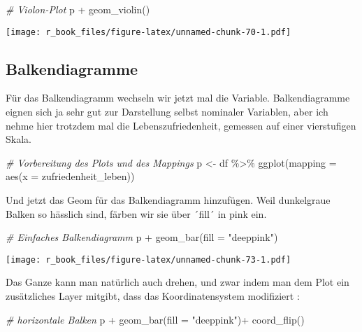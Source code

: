 \documentclass[
]{book}
\newenvironment{Shaded}{\begin{snugshade}}{\end{snugshade}}
\newcommand{\AttributeTok}[1]{\textcolor[rgb]{0.77,0.63,0.00}{#1}}
\newcommand{\CommentTok}[1]{\textcolor[rgb]{0.56,0.35,0.01}{\textit{#1}}}
\newcommand{\FunctionTok}[1]{\textcolor[rgb]{0.00,0.00,0.00}{#1}}
\newcommand{\NormalTok}[1]{#1}
\newcommand{\OtherTok}[1]{\textcolor[rgb]{0.56,0.35,0.01}{#1}}
\newcommand{\SpecialCharTok}[1]{\textcolor[rgb]{0.00,0.00,0.00}{#1}}
\newcommand{\StringTok}[1]{\textcolor[rgb]{0.31,0.60,0.02}{#1}}
\begin{document}
\begin{Shaded}
\begin{Highlighting}[]
\CommentTok{\# Violon{-}Plot}
\NormalTok{p }\SpecialCharTok{+} \FunctionTok{geom\_violin}\NormalTok{()}
\end{Highlighting}
\end{Shaded}

\texttt{[image: r\_book\_files/figure-latex/unnamed-chunk-70-1.pdf]}

\hypertarget{balkendiagramme}{%
\subsection{Balkendiagramme}\label{balkendiagramme}}

Für das Balkendiagramm wechseln wir jetzt mal die Variable. Balkendiagramme eignen sich ja sehr gut zur Darstellung selbst nominaler Variablen, aber ich nehme hier trotzdem mal die Lebenszufriedenheit, gemessen auf einer vierstufigen Skala.

\begin{Shaded}
\begin{Highlighting}[]
\CommentTok{\# Vorbereitung des Plots und des Mappings}
\NormalTok{p }\OtherTok{\textless{}{-}}\NormalTok{ df }\SpecialCharTok{\%\textgreater{}\%} 
  \FunctionTok{ggplot}\NormalTok{(}\AttributeTok{mapping =} \FunctionTok{aes}\NormalTok{(}\AttributeTok{x =}\NormalTok{ zufriedenheit\_leben))}
\end{Highlighting}
\end{Shaded}

Und jetzt das Geom für das Balkendiagramm hinzufügen. Weil dunkelgraue Balken so hässlich sind, färben wir sie über ´fill´ in pink ein.

\begin{Shaded}
\begin{Highlighting}[]
\CommentTok{\# Einfaches Balkendiagramm}
\NormalTok{p }\SpecialCharTok{+} \FunctionTok{geom\_bar}\NormalTok{(}\AttributeTok{fill =} \StringTok{"deeppink"}\NormalTok{)}
\end{Highlighting}
\end{Shaded}

\texttt{[image: r\_book\_files/figure-latex/unnamed-chunk-73-1.pdf]}

Das Ganze kann man natürlich auch drehen, und zwar indem man dem Plot ein zusätzliches Layer mitgibt, dass das Koordinatensystem modifiziert :

\begin{Shaded}
\begin{Highlighting}[]
\CommentTok{\# horizontale Balken}
\NormalTok{p }\SpecialCharTok{+} \FunctionTok{geom\_bar}\NormalTok{(}\AttributeTok{fill =} \StringTok{"deeppink"}\NormalTok{)}\SpecialCharTok{+} 
  \FunctionTok{coord\_flip}\NormalTok{()}
\end{Highlighting}
\end{Shaded}
\end{document}
